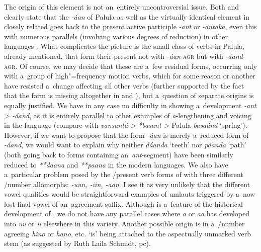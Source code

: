 \largerpage[-1]
The origin of this element is not an~entirely uncontroversial issue. Both \citet[22]{morgenstierne1941} and \citet[48]{buddruss1967} clearly state that the \textit{-áan} of Palula as well as the virtually identical element in closely related \iliSauji goes back to the \iliOIA present active participle \textit{-ant} or \textit{-antaka}, even this with numerous parallels (involving various degrees of reduction) in other \iliNIA languages \citep[270--271]{masica1991}. What complicates the picture is the small class of verbs in Palula, already mentioned, that form their present  not with \textit{-áan}-\textsc{agr} but with \textit{-áand}-\textsc{agr}. Of course, we may decide that these are a~few residual forms, occurring only with a~group of high"=frequency motion verbs, which for some reason or another have resisted a~change affecting all other verbs (further supported by the fact that the form is missing altogether in \iliSauji and \iliKalkoti), but a~question of separate origins is equally justified. We have in any case no difficulty in showing a~development \textit{-ant {\textgreater} -áand}, as it is entirely parallel to other examples of \textit{a}-lengthening and voicing in the language (compare with \iliOIA \textit{vansantá {\textgreater} *basant {\textgreater}} Palula \textit{basaánd} `spring'). However, if we want to propose that the form \textit{-áan} is merely a~reduced form of \textit{-áand}, we would want to explain why neither \textit{dáanda} `teeth' nor \textit{páanda} `path' (both going back to forms containing an~\iliOIA \textit{ant}-segment) have been similarly reduced to \textit{**daana} and \textit{**paana} in the modern languages. We also have a~particular problem posed by the /present verb forms of \iliKalkoti with three different /number allomorphs: \textit{-uun, -iin, -aan}. I see it as very unlikely that the different vowel qualities would be straightforward examples of umlauts triggered by a~now lost final vowel of an~agreement suffix. Although  is a~feature of the historical development of \iliKalkoti, we do not have any parallel cases where \textit{‌a‌} or \textit{‌aa‌} has developed into \textit{‌uu‌} or \textit{‌ii‌} elsewhere in this variety. Another possible origin is in a~/number agreeing  \textit{hino} or \textit{hano}, etc. `is' being attached to the aspectually unmarked verb stem (as suggested by Ruth Laila Schmidt, pc). 



